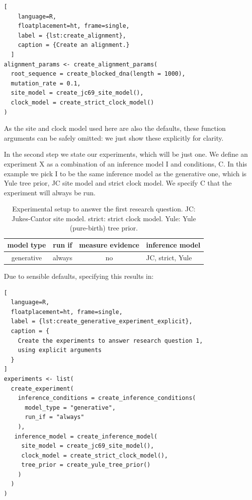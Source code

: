\documentclass{article}
\begin{document}
\begin{lstlisting}[
    language=R,
    floatplacement=ht, frame=single,
    label = {lst:create_alignment}, 
    caption = {Create an alignment.}
  ]
alignment_params <- create_alignment_params(
  root_sequence = create_blocked_dna(length = 1000),
  mutation_rate = 0.1,
  site_model = create_jc69_site_model(),
  clock_model = create_strict_clock_model()
)
\end{lstlisting}

As the site and clock model used here are also the defaults, 
these function arguments can be safely omitted: we just show these
explicitly for clarity.

In the second step we state our experiments, which will be just one.
We define an experiment X as a combination of an inference model I
and conditions, C.
In this example we pick I to be the same inference model as the generative one,
which is Yule tree prior, JC site model and strict clock model.
We specify C that the experiment will always be run.

\begin{table}
  \begin{tabular}{ | c | c | c | l | }
    \hline
    \textbf{model type} & \textbf{run if} & \textbf{measure evidence} & \textbf{inference model} \\ 
    \hline
    generative & always & no & JC, strict, Yule \\
    \hline
  \end{tabular}
  \caption{
    Experimental setup to answer the first research question.
    JC: Jukes-Cantor site model.
    strict: strict clock model.
    Yule: Yule (pure-birth) tree prior.
  }
  \label{tbl:RQ1}
\end{table}

Due to sensible defaults, specifying this
results in:

\begin{lstlisting}[
  language=R, 
  floatplacement=ht, frame=single,
  label = {lst:create_generative_experiment_explicit},
  caption = {
    Create the experiments to answer research question 1, 
    using explicit arguments
  }
]
experiments <- list(
  create_experiment(
    inference_conditions = create_inference_conditions(
      model_type = "generative", 
      run_if = "always"
    ), 
   inference_model = create_inference_model(
     site_model = create_jc69_site_model(), 
     clock_model = create_strict_clock_model(), 
     tree_prior = create_yule_tree_prior()
    )
  )
)
\end{lstlisting}
\end{document}
